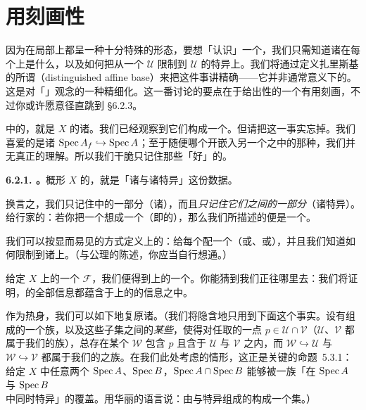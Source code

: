 
\section{用\trDistinguishedAffineBase{}刻画\trQC{}性}

因为\trQCSheaf{}在局部上都呈一种十分特殊的形态，要想「认识」一个\trQCSheaf，我们只需知道诸\trSection{}在每个\trAffine\trOpenSet{}上是什么，以及如何把\trSection{}从一个\trAffine\trOpenSet{} $\mathscr{U}$ 限制到 $\mathscr{U}$ 的特异\trAffine\trOpenSubset{}上。我们将通过定义扎里斯基\trTopology{}的所谓\textbf{\trDistinguishedAffineBase{}}（distinguished affine base）来把这件事讲精确——它并非通常意义下的\trBase。这是对「\trSheafOnBase」观念的一种精细化。这一番讨论的要点在于给出\trQC{}性的一个有用刻画，不过你或许愿意径直跳到 \S6.2.3。

\trDistinguishedAffineBase{}中的\trOpenSet，就是 $X$ 的诸\trAffine\trOpenSubset。我们已经观察到它们构成一个\trBase。但请把这一事实忘掉。我们喜爱的是诸\trDistinguishedOpen{} $\operatorname{Spec} A_f\hookrightarrow\operatorname{Spec} A$；至于随便哪个\trAffine\trOpenSubset{}开嵌入另一个之中的那种\trOpenEmbedding，我们并无真正的理解。所以我们干脆只记住那些「好」的\trInclusionMap。

\textbf{6.2.1. \trhDefinition{}。}\quad 概形 $X$ 的\textbf{\trDistinguishedAffineBase{}}，就是「诸\trAffine\trOpenSet{}与诸特异\trInclusionMap」这份数据。

换言之，我们只记住\trOpenSet{}中的一部分（诸\trAffine\trOpenSet），而且\emph{只记住它们之间的一部分\trMorphism}（诸特异\trMorphism）。给行家的：若你把一个\trTopology{}想成一个\trCategory{}（即\trOpenSet{}的\trCategory），那么我们所描述的便是一个\trSubcategory。

我们可以按显而易见的方式定义\trDistinguishedAffineBase{}上的\trSheaf{}：给每个\trAffine\trOpenSet{}配一个\trSet{}（或\trAbelianGroups、或\trRing），并且我们知道如何限制到诸\trDistinguishedOpen{}上。（\trIdentityAxiom{}与\trGluability{}公理的陈述，你应当自行想通。）

给定 $X$ 上的一个\trSheaf{} $\mathscr{F}$，我们便得到\trDistinguishedAffineBase{}上的一个\trSheaf。你能猜到我们正往哪里去：我们将证明，\trSheaf{}的全部信息都蕴含于\trDistinguishedAffineBase{}上的\trSheaf{}的信息之中。

作为热身，我们可以如下地复原诸\trStalk{}。（我们将隐含地只用到下面这个事实。设有\trOpenSubset{}组成的一个族，以及这些子集之间的\emph{某些}\trInclusionMap，使得对任取的一点 $p\in\mathscr{U}\cap\mathscr{V}$（$\mathscr{U}$、$\mathscr{V}$ 都属于我们的\trOpenSubset{}族），总存在某个 $\mathscr{W}$ 包含 $p$ 且含于 $\mathscr{U}$ 与 $\mathscr{V}$ 之内，而 $\mathscr{W}\hookrightarrow\mathscr{U}$ 与 $\mathscr{W}\hookrightarrow\mathscr{V}$ 都属于我们的\trInclusionMap{}之族。在我们此处考虑的情形，这正是关键的命题~5.3.1：给定 $X$ 中任意两个\trAffine\trOpenSet{} $\operatorname{Spec} A$、$\operatorname{Spec} B$，$\operatorname{Spec} A\cap\operatorname{Spec} B$ 能够被一族「在 $\operatorname{Spec} A$ 与 $\operatorname{Spec} B$ 中同时特异」的\trAffine\trOpenSet{}覆盖。用华丽的语言说：由\trAffine\trOpenSet{}与特异\trInclusionMap{}组成的\trCategory{}构成一个\trFiltered{}集。）

